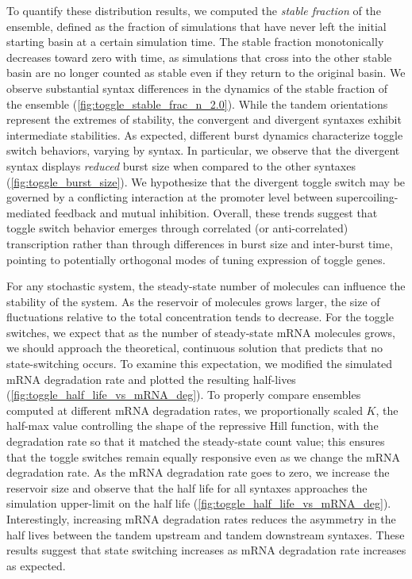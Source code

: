 \documentclass[11pt]{article}
\begin{document}
To quantify these distribution results, we computed the \emph{stable fraction} of the ensemble, defined as the fraction of simulations that have never left the initial starting basin at a certain simulation time.
The stable fraction monotonically decreases toward zero with time, as simulations that cross into the other stable basin are no longer counted as stable even if they return to the original basin.
We observe substantial syntax differences in the dynamics of the stable fraction of the ensemble (\cref{fig:toggle_stable_frac_n_2.0}). While the tandem orientations represent the extremes of stability, the convergent and divergent syntaxes exhibit intermediate stabilities.
As expected, different burst dynamics characterize toggle switch behaviors, varying by syntax. In particular, we observe that the divergent syntax displays \emph{reduced} burst size when compared to the other syntaxes (\cref{fig:toggle_burst_size}). We hypothesize that the divergent toggle switch may be governed by a conflicting interaction at the promoter level between supercoiling-mediated feedback and mutual inhibition.
Overall, these trends suggest that toggle switch behavior emerges through correlated (or anti-correlated) transcription rather than through differences in burst size and inter-burst time, pointing to potentially orthogonal modes of tuning expression of toggle genes.

For any stochastic system, the steady-state number of molecules can influence the stability of the system. As the reservoir of molecules grows larger, the size of fluctuations relative to the total concentration tends to decrease. For the toggle switches, we expect that as the number of steady-state mRNA molecules grows, we should approach the theoretical, continuous solution that predicts that no state-switching occurs. To examine this expectation, we modified the simulated mRNA degradation rate and plotted the resulting half-lives (\cref{fig:toggle_half_life_vs_mRNA_deg}).
To properly compare ensembles computed at different mRNA degradation rates, we proportionally scaled \(K\), the half-max value controlling the shape of the repressive Hill function, with the degradation rate so that it matched the steady-state count value; this ensures that the toggle switches remain equally responsive even as we change the mRNA degradation rate. As the mRNA degradation rate goes to zero, we increase the reservoir size and observe that the half life for all syntaxes approaches the simulation upper-limit on the half life (\cref{fig:toggle_half_life_vs_mRNA_deg}).  Interestingly, increasing mRNA degradation rates reduces the asymmetry in the half lives between the tandem upstream and tandem downstream syntaxes. These results suggest that state switching increases as mRNA degradation rate increases as expected.
\end{document}
